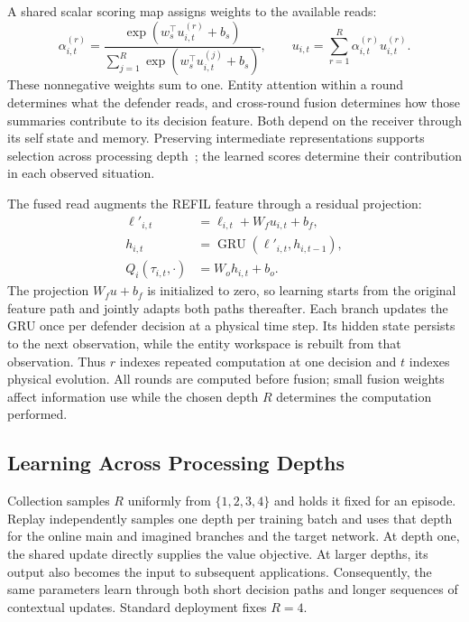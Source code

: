 A shared scalar scoring map assigns weights to the available reads:
\begin{equation}
 \alpha_{i,t}^{(r)}=
 \frac{\exp(w_s^\top u_{i,t}^{(r)}+b_s)}
 {\sum_{j=1}^{R}\exp(w_s^\top u_{i,t}^{(j)}+b_s)},\qquad
 u_{i,t}=\sum_{r=1}^{R}\alpha_{i,t}^{(r)}u_{i,t}^{(r)}.
 \label{eq:fusion}
\end{equation}
These nonnegative weights sum to one. Entity attention within a round determines what the defender reads, and cross-round fusion determines how those summaries contribute to its decision feature. Both depend on the receiver through its self state and memory. Preserving intermediate representations supports selection across processing depth~\cite{xu2018jk}; the learned scores determine their contribution in each observed situation.

The fused read augments the REFIL feature through a residual projection:
\begin{align}
 \ell'_{i,t}&=\ell_{i,t}+W_f u_{i,t}+b_f,\nonumber\\
 h_{i,t}&=\operatorname{GRU}(\ell'_{i,t},h_{i,t-1}),\nonumber\\
 Q_i(\tau_{i,t},\cdot)&=W_o h_{i,t}+b_o.
 \label{eq:decision}
\end{align}
The projection $W_fu+b_f$ is initialized to zero, so learning starts from the original feature path and jointly adapts both paths thereafter. Each branch updates the GRU once per defender decision at a physical time step. Its hidden state persists to the next observation, while the entity workspace is rebuilt from that observation. Thus $r$ indexes repeated computation at one decision and $t$ indexes physical evolution. All rounds are computed before fusion; small fusion weights affect information use while the chosen depth $R$ determines the computation performed.



\subsection{Learning Across Processing Depths}
Collection samples $R$ uniformly from $\{1,2,3,4\}$ and holds it fixed for an episode. Replay independently samples one depth per training batch and uses that depth for the online main and imagined branches and the target network. At depth one, the shared update directly supplies the value objective. At larger depths, its output also becomes the input to subsequent applications. Consequently, the same parameters learn through both short decision paths and longer sequences of contextual updates. Standard deployment fixes $R=4$.

